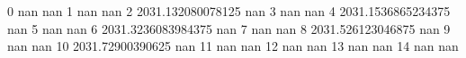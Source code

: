 0 nan nan
1 nan nan
2 2031.132080078125 nan
3 nan nan
4 2031.1536865234375 nan
5 nan nan
6 2031.3236083984375 nan
7 nan nan
8 2031.526123046875 nan
9 nan nan
10 2031.72900390625 nan
11 nan nan
12 nan nan
13 nan nan
14 nan nan
